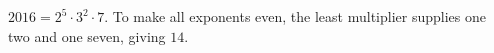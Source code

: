 $2016=2^5\cdot3^2\cdot7$. To make all exponents even, the least multiplier supplies one two and one seven, giving $\boxed{14}$.
